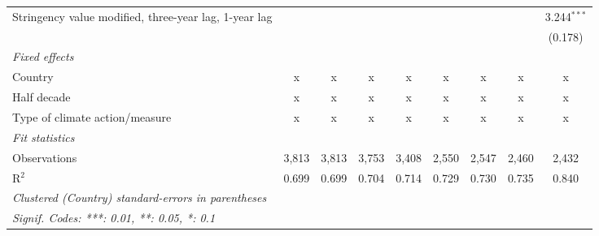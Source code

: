 \begin{table}[htbp]
\begin{tabular}{lcccccccc}
      Stringency value modified, three-year lag, 1-year lag                     &               &               &               &              &             &              &              & 3.244$^{***}$\\   
                                                                                &               &               &               &              &             &              &              & (0.178)\\   
      \emph{Fixed effects}\\
      Country                                                                   & x             & x             & x             & x            & x           & x            & x            & x\\  
      Half decade                                                               & x             & x             & x             & x            & x           & x            & x            & x\\  
      Type of climate action/measure                                            & x             & x             & x             & x            & x           & x            & x            & x\\  
      \midrule \emph{Fit statistics}\\
      Observations                                                              & 3,813         & 3,813         & 3,753         & 3,408        & 2,550       & 2,547        & 2,460        & 2,432\\  
      R$^2$                                                                     & 0.699         & 0.699         & 0.704         & 0.714        & 0.729       & 0.730        & 0.735        & 0.840\\  
      \midrule
      \multicolumn{9}{l}{\emph{Clustered (Country) standard-errors in parentheses}}\\
      \multicolumn{9}{l}{\emph{Signif. Codes: ***: 0.01, **: 0.05, *: 0.1}}\\
   \end{tabular}
\end{table}


